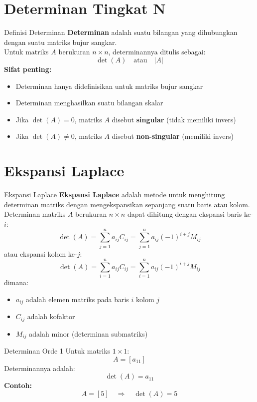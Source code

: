 \documentclass{beamer}
\begin{document}
\section{Determinan Tingkat N}
\begin{frame}[t,fragile]{Definisi Determinan}
\textbf{Determinan} adalah suatu bilangan yang dihubungkan dengan suatu matriks bujur sangkar.\\
\vspace{0.3cm}
Untuk matriks $A$ berukuran $n \times n$, determinannya ditulis sebagai:
$$ \det(A) \quad \text{atau} \quad |A| $$
\vspace{0.3cm}
\textbf{Sifat penting:}
\begin{itemize}
\item Determinan hanya didefinisikan untuk matriks bujur sangkar
\item Determinan menghasilkan suatu bilangan skalar
\item Jika $\det(A) = 0$, matriks $A$ disebut \textbf{singular} (tidak memiliki invers)
\item Jika $\det(A) \neq 0$, matriks $A$ disebut \textbf{non-singular} (memiliki invers)
\end{itemize}
\end{frame}

\section{Ekspansi Laplace}
\begin{frame}[t,fragile]{Ekspansi Laplace}
\textbf{Ekspansi Laplace} adalah metode untuk menghitung determinan matriks dengan mengekspansikan sepanjang suatu baris atau kolom.\\
\vspace{0.3cm}
Determinan matriks $A$ berukuran $n \times n$ dapat dihitung dengan ekspansi baris ke-$i$:
$$ \det(A) = \sum_{j=1}^{n} a_{ij} C_{ij} = \sum_{j=1}^{n} a_{ij} (-1)^{i+j} M_{ij} $$
atau ekspansi kolom ke-$j$:
$$ \det(A) = \sum_{i=1}^{n} a_{ij} C_{ij} = \sum_{i=1}^{n} a_{ij} (-1)^{i+j} M_{ij} $$
dimana:
\begin{itemize}
\item $a_{ij}$ adalah elemen matriks pada baris $i$ kolom $j$
\item $C_{ij}$ adalah kofaktor
\item $M_{ij}$ adalah minor (determinan submatriks)
\end{itemize}
\end{frame}

\begin{frame}[t,fragile]{Determinan Orde 1}
Untuk matriks $1 \times 1$:
$$ A = [a_{11}] $$
Determinannya adalah:
$$ \det(A) = a_{11} $$
\vspace{0.3cm}
\textbf{Contoh:}
$$ A = [5] \quad \Longrightarrow \quad \det(A) = 5 $$
\end{frame}
\end{document}
